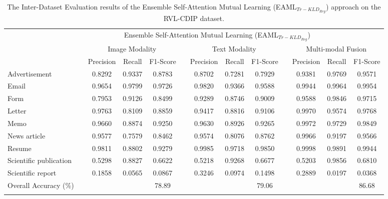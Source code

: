 \documentclass[twocolumn]{svjour3}
\begin{document}
\setlength\tabcolsep{3.8 pt}
\begin{table*}[tbh]
\small
\centering
\caption{The Inter-Dataset Evaluation results of the Ensemble Self-Attention Mutual Learning (EAML$_{{Tr-KLD}_{Reg}}$) approach on the RVL-CDIP dataset.}
\resizebox{\textwidth}{!} {\begin{tabular}{lcccccccccccc}
    \hline\noalign{\smallskip}
     \multicolumn{1}{c}{} && \multicolumn{10}{c}{Ensemble Self-Attention Mutual Learning (EAML$_{{Tr-KLD}_{Reg}}$)} \\
         \noalign{\smallskip}\hline\noalign{\smallskip}
         \multicolumn{1}{c}{Class Labels} && \multicolumn{3}{c}{Image Modality} && \multicolumn{3}{c}{Text Modality} && \multicolumn{3}{c}{Multi-modal Fusion}\\
         \noalign{\smallskip}\hline\noalign{\smallskip}
          && Precision & Recall & F1-Score &&  Precision & Recall & F1-Score && Precision & Recall & F1-Score\\
         \cmidrule{3-13}
         Advertisement 
         && 0.8292 & 0.9337 & 0.8783
         && 0.8702 & 0.7281 & 0.7929 
         && 0.9381 & 0.9769 & 0.9571 
         \\
         Email 
         && 0.9654 & 0.9799 & 0.9726
         && 0.9820 & 0.9366 & 0.9588 
         && 0.9944 & 0.9964 & 0.9954 
         \\
         Form 
         && 0.7953 & 0.9126 & 0.8499 
         && 0.9289 & 0.8746 & 0.9009 
         && 0.9588 & 0.9846 & 0.9715 
         \\
         Letter 
         && 0.9763 & 0.8109 & 0.8859
         && 0.9417 & 0.8816 & 0.9106 
         && 0.9970 & 0.9574 & 0.9768
         \\
         Memo 
         && 0.9660 & 0.8874 & 0.9250 
         && 0.9630 & 0.8926 & 0.9265 
         && 0.9972 & 0.9729 & 0.9849 
         \\
         News article 
         && 0.9577 & 0.7579 & 0.8462
         && 0.9574 & 0.8076 & 0.8762 
         && 0.9966 & 0.9197 & 0.9566 
         \\
         Resume 
         && 0.9811 & 0.8802 & 0.9279
         && 0.9985 & 0.9718 & 0.9850 
         && 0.9998 & 0.9891 & 0.9944 
         \\
         Scientific publication 
         && 0.5298 & 0.8827 & 0.6622
         && 0.5218 & 0.9268 & 0.6677 
         && 0.5203 & 0.9856 & 0.6810
         \\
         Scientific report 
         && 0.1858 & 0.0565 & 0.0867
         && 0.3246 & 0.0974 & 0.1498 
         && 0.2889 & 0.0197 & 0.0368 
         \\
    \noalign{\smallskip}\hline\noalign{\smallskip}
        Overall Accuracy (\%) && & & 78.89 &&  &  & 79.06 &&  &  & 86.68 \\
    \noalign{\smallskip}\hline
    
    \end{tabular}}
    \label{tab:Evaluation of APML on RVLCDIP}
    
\end{table*}
\end{document}
